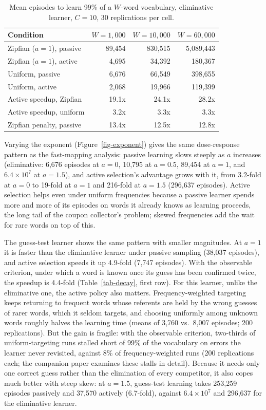 \documentclass[a4paper,natbib,man]{apa6}
\begin{document}
\begin{table}[h]
\centering
\caption{\label{tab-incremental} Mean episodes to learn 99\% of a $W$-word vocabulary, eliminative learner, $C=10$, 30 replications per cell.}
\small
\begin{tabular}{lrrr}
\hline
Condition & $W=1{,}000$ & $W=10{,}000$ & $W=60{,}000$ \\
\hline
Zipfian ($a=1$), passive & 89{,}454 & 830{,}515 & 5{,}089{,}443 \\
Zipfian ($a=1$), active & 4{,}695 & 34{,}392 & 180{,}367 \\
Uniform, passive & 6{,}676 & 66{,}549 & 398{,}655 \\
Uniform, active & 2{,}068 & 19{,}966 & 119{,}399 \\
\hline
Active speedup, Zipfian & 19.1x & 24.1x & 28.2x \\
Active speedup, uniform & 3.2x & 3.3x & 3.3x \\
Zipfian penalty, passive & 13.4x & 12.5x & 12.8x \\
\hline
\end{tabular}
\end{table}

Varying the exponent (Figure~\ref{fig-exponent}) gives the same dose-response pattern as the fast-mapping analysis: passive learning slows steeply as $a$ increases (eliminative: 6,676 episodes at $a=0$, 10,795 at $a=0.5$, 89,454 at $a=1$, and $6.4 \times 10^7$ at $a=1.5$), and active selection's advantage grows with it, from 3.2-fold at $a=0$ to 19-fold at $a=1$ and 216-fold at $a=1.5$ (296,637 episodes). Active selection helps even under uniform frequencies because a passive learner spends more and more of its episodes on words it already knows as learning proceeds, the long tail of the coupon collector's problem; skewed frequencies add the wait for rare words on top of this.

The guess-test learner shows the same pattern with smaller magnitudes. At $a=1$ it is faster than the eliminative learner under passive sampling (38,037 episodes), and active selection speeds it up 4.9-fold (7,747 episodes). With the observable criterion, under which a word is known once its guess has been confirmed twice, the speedup is 4.4-fold (Table~\ref{tab-decay}, first row). For this learner, unlike the eliminative one, the active policy also matters. Frequency-weighted targeting keeps returning to frequent words whose referents are held by the wrong guesses of rarer words, which it seldom targets, and choosing uniformly among unknown words roughly halves the learning time (means of 3,760 vs.\ 8,007 episodes; 200 replications). But the gain is fragile: with the observable criterion, two-thirds of uniform-targeting runs stalled short of 99\% of the vocabulary on errors the learner never revisited, against 8\% of frequency-weighted runs (200 replications each; the companion paper examines these stalls in detail). Because it needs only one correct guess rather than the elimination of every competitor, it also copes much better with steep skew: at $a=1.5$, guess-test learning takes 253,259 episodes passively and 37,570 actively (6.7-fold), against $6.4 \times 10^7$ and 296,637 for the eliminative learner.
\end{document}
